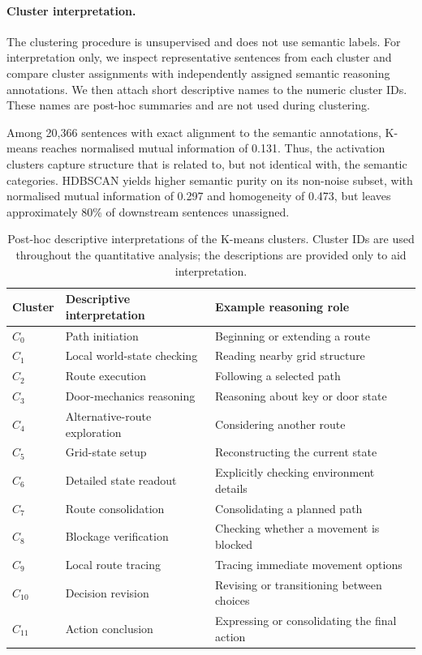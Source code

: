 \documentclass{article}
\begin{document}
\paragraph{Cluster interpretation.}
The clustering procedure is unsupervised and does not use semantic labels.
For interpretation only, we inspect representative sentences from each
cluster and compare cluster assignments with independently assigned semantic
reasoning annotations. We then attach short descriptive names to the numeric
cluster IDs. These names are post-hoc summaries and are not used during
clustering.

Among 20,366 sentences with exact alignment to the semantic annotations,
K-means reaches normalised mutual information of 0.131. Thus, the activation
clusters capture structure that is related to, but not identical with, the
semantic categories. HDBSCAN yields higher semantic purity on its non-noise
subset, with normalised mutual information of 0.297 and homogeneity of
0.473, but leaves approximately 80\% of downstream sentences unassigned.

\begin{table}[htbp]
\centering
\small
\begin{tabular}{lll}
\toprule
Cluster & Descriptive interpretation & Example reasoning role \\
\midrule
\(C_0\)  & Path initiation & Beginning or extending a route \\
\(C_1\)  & Local world-state checking & Reading nearby grid structure \\
\(C_2\)  & Route execution & Following a selected path \\
\(C_3\)  & Door-mechanics reasoning & Reasoning about key or door state \\
\(C_4\)  & Alternative-route exploration & Considering another route \\
\(C_5\)  & Grid-state setup & Reconstructing the current state \\
\(C_6\)  & Detailed state readout & Explicitly checking environment details \\
\(C_7\)  & Route consolidation & Consolidating a planned path \\
\(C_8\)  & Blockage verification & Checking whether a movement is blocked \\
\(C_9\)  & Local route tracing & Tracing immediate movement options \\
\(C_{10}\) & Decision revision & Revising or transitioning between choices \\
\(C_{11}\) & Action conclusion & Expressing or consolidating the final action \\
\bottomrule
\end{tabular}
\caption{Post-hoc descriptive interpretations of the K-means clusters.
Cluster IDs are used throughout the quantitative analysis; the descriptions
are provided only to aid interpretation.}
\label{tab:cluster-labels}
\end{table}
\end{document}
